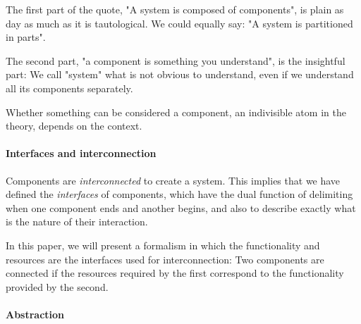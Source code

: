 The first part of the quote, "A system is composed of components", is plain as day as much as
it is tautological. We could equally say: "A system is partitioned in parts".

The second part, "a component is something you understand", is the insightful part: We call
"system" what is not obvious to understand, even if we understand all its components
separately.

Whether something can be considered a component, an indivisible atom in the theory, depends on the context.
%


\paragraph{Interfaces and interconnection}

Components are \emph{interconnected} to create a system.
This implies that we have defined the \emph{interfaces} of components, which
have the dual function of delimiting when one component ends and another begins,
and also to describe exactly what is the nature of their interaction.

\begin{example}
\end{example}

\begin{example}
\end{example}

In this paper, we will present a formalism in which the functionality and resources
are the interfaces used for interconnection: Two components are connected
if the resources required by the first correspond to the functionality
provided by the second.
%
%



\paragraph{Abstraction}

